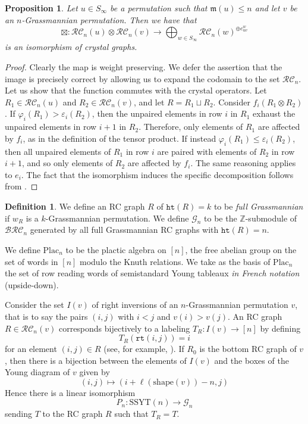 \documentclass{amsart}
\newtheorem{proposition}[lemma]{Proposition}
\theoremstyle{definition}
\newtheorem{definition}[lemma]{Definition}
\theoremstyle{remark}
\numberwithin{equation}{subsection}
\newcommand{\wof}[1]{w_{#1}}
\newcommand{\grass}{\mathcal{G}}
\newcommand{\plac}{\mathrm{Plac}}
\newcommand{\rtt}{\mathtt{rt}}
\newcommand{\hr}{\mathtt{ht}}
\newcommand{\BRC}{\mathcal{BRC}}
\newcommand{\RC}{\mathcal{RC}}
\newcommand{\maxd}{\mathfrak{m}}
\begin{document}
\begin{proposition} \label{proposition:boxproduct}
  Let $u\in S_\infty$ be a permutation such that $\maxd(u)\leq n$ and let $v$ be an $n$-Grassmannian permutation. Then we have that
  $$\boxtimes:\RC_n(u)\otimes \RC_n(v)\to \bigoplus_{w\in S_\infty} \RC_n(w)^{\oplus c_{uv}^w}$$
  is an isomorphism of crystal graphs. 
\end{proposition}
\begin{proof}
Clearly the map is weight preserving. We defer the assertion that the image is precisely correct by allowing us to expand the codomain to the set $\RC_n$. 
Let us show that the function commutes with the crystal operators. Let $R_1\in \RC_n(u)$ and $R_2\in \RC_n(v)$, and let $R=R_1\sqcup R_2$. Consider $f_i(R_1\otimes R_2)$. If $\varphi_i(R_1)>\varepsilon_i(R_2)$, then the unpaired elements in row $i$ in $R_1$ exhaust the unpaired elements in row $i+1$ in $R_2$. Therefore, only elements of $R_1$ are affected by $f_i$, as in the definition of the tensor product. If instead $\varphi_i(R_1)\leq \varepsilon_i(R_2)$, then all unpaired elements of $R_1$ in row $i$ are paired with elements of $R_2$ in row $i+1$, and so only elements of $R_2$ are affected by $f_i$. The same reasoning applies to $e_i$. The fact that the isomorphism induces the specific decomposition follows from \cite{kouno2020decomposition}.
\end{proof}

\begin{definition}
We define an RC graph $R$ of $\hr(R)=k$ to be \emph{full Grassmannian} if $\wof{R}$ is a $k$-Grassmannian permutation. We define $\grass_n$ to be the $\mathbb{Z}$-submodule of $\BRC_n$ generated by all full Grassmannian RC graphs with $\hr(R)= n$.

We define $\plac_n$ to be the plactic algebra on $[n]$, the free abelian group on the set of words in $[n]$ modulo the Knuth relations. We take as the basis of $\plac_n$ the set of row reading words of semistandard Young tableaux \emph{in French notation} (upside-down).

Consider the set $I(v)$ of right inversions of an $n$-Grassmannian permutation $v$, that is to say the pairs $(i,j)$ with $i<j$ and $v(i)>v(j)$. An RC graph $R\in\RC_n(v)$ corresponds bijectively to a labeling $T_R:I(v)\to [n]$ by defining
$$T_R(\rtt(i,j)) = i$$
for an element $(i,j)\in R$ (see, for example, \cite{axelrodfreed2025inversionstableaux}). If $R_0$ is the bottom RC graph of $v$, then there is a bijection between the elements of $I(v)$ and the boxes of the Young diagram of $v$ given by
$$(i,j) \mapsto (i + \ell(\mathrm{shape}(v)) - n, j)$$
Hence there is a linear isomorphism
$$P_n:\mathrm{SSYT}(n)\to \grass_n$$
sending $T$ to the RC graph $R$ such that $T_R = T$.
\end{definition}
\end{document}
